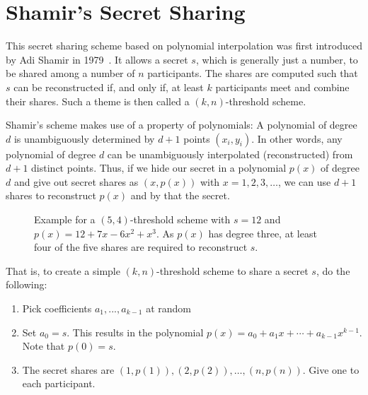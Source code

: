 \section{Shamir's Secret Sharing}
This secret sharing scheme based on polynomial interpolation was first introduced by Adi Shamir in 1979~\cite{shamir_how_1979}.
It allows a secret $s$, which is generally just a number, to be shared among a number of $n$ participants.
The shares are computed such that $s$ can be reconstructed if, and only if, at least $k$ participants meet and combine their shares.
Such a theme is then called a $(k,n)$-threshold scheme.~\cite{shamir_how_1979}

Shamir's scheme makes use of a property of polynomials: A polynomial of degree $d$ is unambiguously determined by $d+1$ points $(x_i, y_i)$.
In other words, any polynomial of degree $d$ can be unambiguously interpolated (reconstructed) from $d+1$ distinct points.
Thus, if we hide our secret in a polynomial $p(x)$ of degree $d$ and give out secret shares as $(x, p(x))$ with $x = 1, 2, 3, \dots$, we can use $d+1$ shares to reconstruct $p(x)$ and by that the secret.\cite{shamir_how_1979}

\begin{figure}
    \centering
    \caption{Example for a $(5, 4)$-threshold scheme with $s=12$ and $p(x) = 12 + 7x - 6x^2 + x^3$. As $p(x)$ has degree three, at least four of the five shares are required to reconstruct $s$.}
    \label{fig:sss}
\end{figure}

That is, to create a simple $(k, n)$-threshold scheme to share a secret $s$, do the following:~\cite{shamir_how_1979}
\begin{enumerate}
    \item Pick coefficients $a_1, ..., a_{k-1}$ at random 
    \item Set $a_0 = s$. This results in the polynomial $p(x) = a_0 + a_1x + \cdots + a_{k-1}x^{k-1}$. Note that $p(0) = s$.
    \item The secret shares are $(1, p(1)), (2, p(2)), \dots, (n, p(n))$. Give one to each participant.
\end{enumerate}

